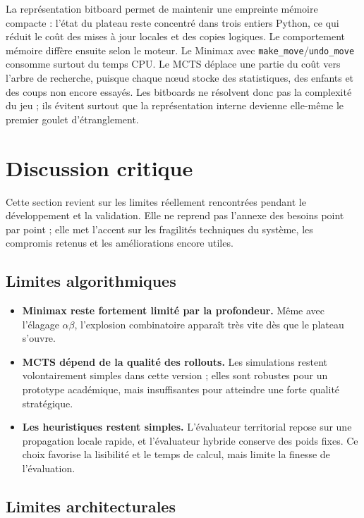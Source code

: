 \documentclass[a4paper]{article}
\begin{document}
La représentation bitboard permet de maintenir une empreinte mémoire compacte : l'état du plateau reste concentré dans trois entiers Python, ce qui réduit le coût des mises à jour locales et des copies logiques. Le comportement mémoire diffère ensuite selon le moteur. Le Minimax avec \texttt{make\_move}/\texttt{undo\_move} consomme surtout du temps CPU. Le MCTS déplace une partie du coût vers l'arbre de recherche, puisque chaque nœud stocke des statistiques, des enfants et des coups non encore essayés. Les bitboards ne résolvent donc pas la complexité du jeu ; ils évitent surtout que la représentation interne devienne elle-même le premier goulet d'étranglement.

\section{Discussion critique}

Cette section revient sur les limites réellement rencontrées pendant le développement et la validation. Elle ne reprend pas l'annexe des besoins point par point ; elle met l'accent sur les fragilités techniques du système, les compromis retenus et les améliorations encore utiles.

\subsection{Limites algorithmiques}

\begin{itemize}
    \item \textbf{Minimax reste fortement limité par la profondeur.} Même avec l'élagage $\alpha\beta$, l'explosion combinatoire apparaît très vite dès que le plateau s'ouvre.
    \item \textbf{MCTS dépend de la qualité des rollouts.} Les simulations restent volontairement simples dans cette version ; elles sont robustes pour un prototype académique, mais insuffisantes pour atteindre une forte qualité stratégique.
    \item \textbf{Les heuristiques restent simples.} L'évaluateur territorial repose sur une propagation locale rapide, et l'évaluateur hybride conserve des poids fixes. Ce choix favorise la lisibilité et le temps de calcul, mais limite la finesse de l'évaluation.
\end{itemize}

\subsection{Limites architecturales}
\end{document}
